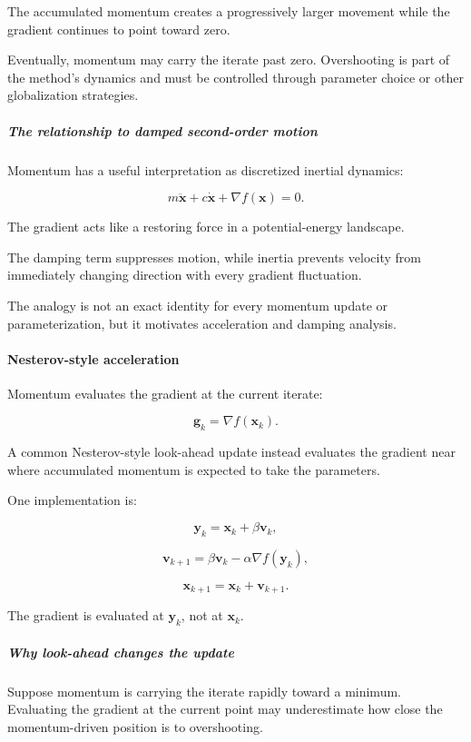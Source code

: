 The accumulated momentum creates a progressively larger movement while the gradient continues to point toward zero.

Eventually, momentum may carry the iterate past zero. Overshooting is part of the method's dynamics and must be controlled through parameter choice or other globalization strategies.

\subparagraph{The relationship to damped second-order motion}\label{the-relationship-to-damped-second-order-motion}

Momentum has a useful interpretation as discretized inertial dynamics:

\[
m\ddot{\mathbf x} +c\dot{\mathbf x} +\nabla f(\mathbf x)=0.
\]

The gradient acts like a restoring force in a potential-energy landscape.

The damping term suppresses motion, while inertia prevents velocity from immediately changing direction with every gradient fluctuation.

The analogy is not an exact identity for every momentum update or parameterization, but it motivates acceleration and damping analysis.

\paragraph{Nesterov-style acceleration}\label{nesterov-style-acceleration}

Momentum evaluates the gradient at the current iterate:

\[
\mathbf g_k=\nabla f(\mathbf x_k).
\]

A common Nesterov-style look-ahead update instead evaluates the gradient near where accumulated momentum is expected to take the parameters.

One implementation is:

\[
\mathbf y_k=\mathbf x_k+\beta\mathbf v_k,
\]

\[
\mathbf v_{k+1} = \beta\mathbf v_k-\alpha\nabla f(\mathbf y_k),
\]

\[
\mathbf x_{k+1}=\mathbf x_k+\mathbf v_{k+1}.
\]

The gradient is evaluated at \(\mathbf y_k\), not at \(\mathbf x_k\).

\subparagraph{Why look-ahead changes the update}\label{why-look-ahead-changes-the-update}

Suppose momentum is carrying the iterate rapidly toward a minimum. Evaluating the gradient at the current point may underestimate how close the momentum-driven position is to overshooting.

